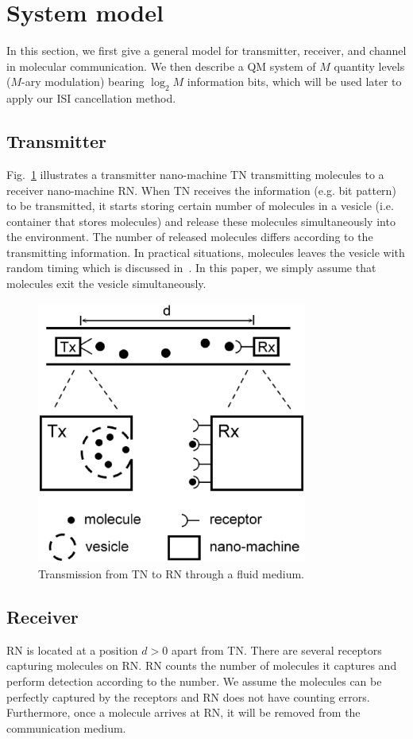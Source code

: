 \section{System model}
In this section, we first give a general model for transmitter, receiver, and channel in molecular communication. We then describe a QM system of $M$ quantity levels ($M$-ary modulation) bearing $\log_2M$ information bits, which will be used later to apply our ISI cancellation method.

\subsection{Transmitter}
Fig.~\ref{fig:machine} illustrates a transmitter nano-machine TN transmitting molecules to a receiver nano-machine RN. When TN receives the information (e.g. bit pattern) to be transmitted, it starts storing certain number of molecules in a vesicle (i.e. container that stores molecules) and release these molecules simultaneously into the environment. The number of released molecules differs according to the transmitting information. In practical situations, molecules leaves the vesicle with random timing which is discussed in~\cite{secrete_phy}. In this paper, we simply assume that molecules exit the vesicle simultaneously.

\begin{figure}[htb]
\centering
\includegraphics[width=3.5in, keepaspectratio]{QM/machine.eps}
\caption{Transmission from TN to RN through a fluid medium.} \label{fig:machine}
\end{figure}

\subsection{Receiver}
RN is located at a position $d > 0$ apart from TN. There are several receptors capturing molecules on RN. RN counts the number of molecules it captures and perform detection according to the number. We assume the molecules can be perfectly captured by the receptors and RN does not have counting errors. Furthermore, once a molecule arrives at RN, it will be removed from the communication medium.

